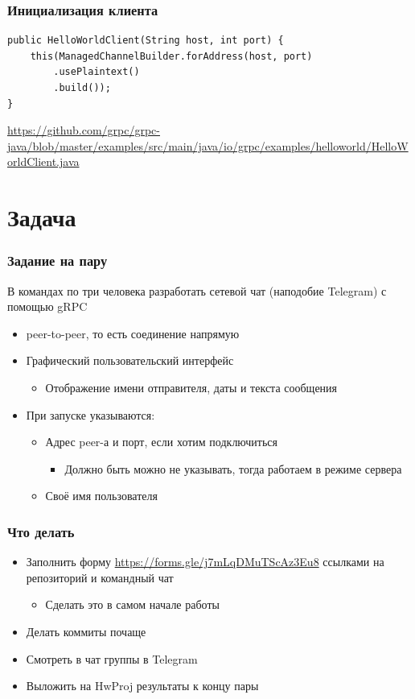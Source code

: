 \documentclass[xetex,mathserif,serif]{beamer}
\begin{document}
    \begin{frame}[fragile]
        \frametitle{Инициализация клиента}
        \begin{verbatim}
public HelloWorldClient(String host, int port) {
    this(ManagedChannelBuilder.forAddress(host, port)
        .usePlaintext()
        .build());
}
        \end{verbatim}
        \vspace{5mm}
        \url{https://github.com/grpc/grpc-java/blob/master/examples/src/main/java/io/grpc/examples/helloworld/HelloWorldClient.java}
    \end{frame}

    \section{Задача}

    \begin{frame}
        \frametitle{Задание на пару}
        В командах по три человека разработать сетевой чат (наподобие Telegram) с помощью gRPC
        \begin{itemize}
            \item peer-to-peer, то есть соединение напрямую
            \item Графический пользовательский интерфейс
            \begin{itemize}
                \item Отображение имени отправителя, даты и текста сообщения
            \end{itemize}
            \item При запуске указываются:
            \begin{itemize}
                \item Адрес peer-а и порт, если хотим подключиться
                \begin{itemize}
                    \item Должно быть можно не указывать, тогда работаем в режиме сервера
                \end{itemize}
                \item Своё имя пользователя
            \end{itemize}
        \end{itemize}
    \end{frame}

    \begin{frame}
        \frametitle{Что делать}
        \begin{itemize}
            \item Заполнить форму \url{https://forms.gle/j7mLqDMuTScAz3Eu8} ссылками на репозиторий и командный чат
            \begin{itemize}
                \item Сделать это в самом начале работы
            \end{itemize}
            \item Делать коммиты почаще
            \item Смотреть в чат группы в Telegram
            \item Выложить на HwProj результаты к концу пары
        \end{itemize}
    \end{frame}
\end{document}
